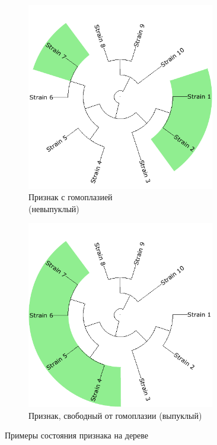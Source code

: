 \begin{figure}[h!]
    \centering
    \begin{subfigure}[b]{0.49\textwidth}
         \centering
         \includegraphics[width=0.9\textwidth]{images/part1/tree_example_1.pdf}
         \caption{Признак с гомоплазией \\(невыпуклый)}
         \label{fig:convex-example-unconvex}
     \end{subfigure}
     \vspace{0.5cm}
     \begin{subfigure}[b]{0.49\textwidth}
         \centering
         \includegraphics[width=0.9\textwidth]{images/part1/tree_example_2.pdf}
         \caption{Признак, свободный от гомоплазии (выпуклый)}
         \label{fig:convex-example-convex}
     \end{subfigure}
     \caption{Примеры состояния признака на дереве}
     \label{fig:convex-example}
\end{figure}

